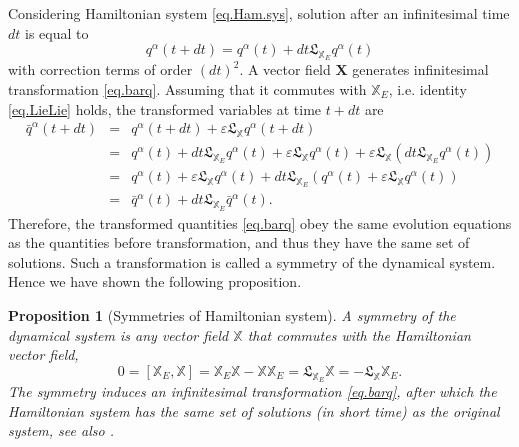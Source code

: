 \documentclass[
10pt, %
a4paper, %
oneside, %
headinclude,footinclude, %
BCOR5mm, %
]{scrartcl}
\newcommand{\XX}{\mathbf{X}}
\newcommand{\XXXX}{\boldsymbol{\mathbb{X}}}
\newcommand{\eps}{\varepsilon}
\newcommand{\Lie}{\mathfrak{L}}
\newcommand{\VK}[1]{{\color{Cyan}VK:\ \ #1}}
\newtheorem{prop}{Proposition}
\begin{document}
Considering Hamiltonian system \eqref{eq.Ham.sys}, solution after an infinitesimal time $dt$ is equal to 
\begin{equation}
    q^\alpha(t+ dt) = q^\alpha(t) + dt \Lie_{\XXXX_E} q^\alpha(t) 
\end{equation}
with correction terms of order $(dt)^2$. A vector field $\XX$ generates infinitesimal transformation \eqref{eq.barq}. Assuming that it commutes with $\XXXX_E$, i.e. identity \eqref{eq.LieLie} holds,  the transformed variables at time $t+dt$ are
\begin{eqnarray}
   \bar{q}^\alpha(t+dt) &=& q^\alpha(t+dt) + \eps \Lie_{\XXXX} q^\alpha(t+dt)\nonumber\\
   &=& q^\alpha(t) + dt \Lie_{\XXXX_E} q^\alpha(t) +\eps \Lie_{\XXXX} q^\alpha(t) + \eps \Lie_{\XXXX} (dt \Lie_{\XXXX_E} q^\alpha(t))\nonumber\\
   &=&q^\alpha(t) +\eps \Lie_{\XXXX} q^\alpha(t) +dt \Lie_{\XXXX_E}\left(q^\alpha(t) + \eps \Lie_{\XXXX} q^\alpha(t)\right)\nonumber\\
   &=& \bar{q}^\alpha(t) + dt \Lie_{\XXXX_E} \bar{q}^\alpha(t).
\end{eqnarray}
Therefore, the transformed quantities \eqref{eq.barq} obey the same evolution equations as the quantities before transformation, and thus they have the same set of solutions. Such a transformation is called a symmetry of the dynamical system. Hence we have shown the following proposition. 
\begin{prop}[Symmetries of Hamiltonian system] %
A symmetry of the dynamical system is any vector field $\XXXX$ that commutes with the Hamiltonian vector field, 
\begin{equation}\label{eq.def.sym.sys}
    0 = [\XXXX_E,\XXXX] = \XXXX_E \XXXX - \XXXX \XXXX_E = \Lie_{\XXXX_E} \XXXX = -\Lie_{\XXXX} \XXXX_E.
\end{equation}
The symmetry induces an infinitesimal transformation \eqref{eq.barq}, %
 after which the Hamiltonian system has the same set of solutions (in short 
 time) as the original system, see also \cite{olver2000applications}.
\end{prop}
\end{document}
